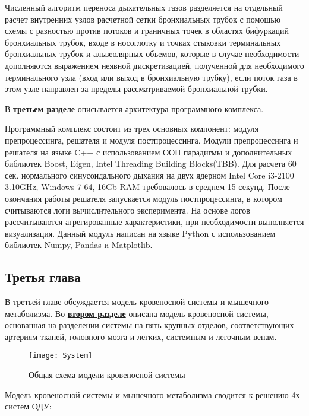 Численный алгоритм переноса дыхательных газов разделяется на отдельный расчет внутренних узлов расчетной сетки бронхиальных трубок с помощью схемы с разностью против потоков и граничных точек в областях бифуркаций бронхиальных трубок, входе в носоглотку и точках стыковки терминальных бронхиальных трубок и альвеолярных объемов, которые в случае необходимости дополняются выражением неявной дискретизацией, полученной для необходимого терминального узла (вход или выход в бронхиальную трубку), если поток газа в этом узле направлен за пределы рассматриваемой бронхиальной трубки.

В \underline{\textbf{третьем разделе}} описывается архитектура программного комплекса.

Программный комплекс состоит из трех основных компонент: модуля препроцессинга, решателя и модуля постпроцессинга. Модули препроцессинга и решателя на языке C++ с использованием ООП парадигмы и дополнительных библиотек Boost, Eigen, Intel Threading Building Blocks(TBB). Для расчета 60 сек. нормального синусоидального дыхания на двух ядерном Intel Core i3-2100 3.10GHz, Windows 7-64, 16Gb RAM требовалось в среднем 15 секунд. После окончания работы решателя запускается модуль постпроцессинга, в котором считываются логи вычислительного эксперимента. На основе логов рассчитываются агрегированные характеристики, при необходимости выполняется визуализация. Данный модуль написан на языке Python с использованием библиотек Numpy, Pandas и Matplotlib.

\subsection*{Третья глава}

В третьей главе обсуждается модель кровеносной системы и мышечного метаболизма.
Во \underline{\textbf{втором разделе}} описана модель кровеносной системы, основанная на разделении системы на пять крупных отделов, соответствующих артериям тканей, головного мозга и легких, системным и легочным венам.
\begin{figure}[!ht]
\centering
\texttt{[image: System]}
\caption{Общая схема модели кровеносной системы} \notag
\label{systemChart}
\end{figure}

Модель кровеносной системы и мышечного метаболизма сводится к решению 4х систем ОДУ:

